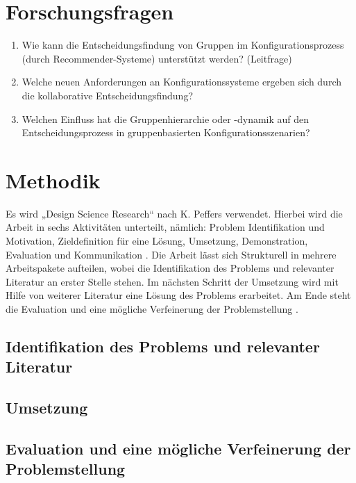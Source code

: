 \documentclass{article}
\begin{document}
\section{Forschungsfragen}

\begin{enumerate}
    \item Wie kann die Entscheidungsfindung von Gruppen im Konfigurationsprozess (durch Recommender-Systeme) unterstützt werden? (Leitfrage)
    \item Welche neuen Anforderungen an Konfigurationssysteme ergeben sich durch die kollaborative Entscheidungsfindung?
    \item Welchen Einfluss hat die Gruppenhierarchie oder -dynamik auf den Entscheidungsprozess in gruppenbasierten Konfigurationsszenarien?
\end{enumerate}

\section{Methodik}

Es wird „Design Science Research“ nach K. Peffers verwendet. Hierbei wird die Arbeit in sechs Aktivitäten unterteilt, nämlich: Problem Identifikation und Motivation, Zieldefinition für eine Lösung, Umsetzung, Demonstration, Evaluation und  Kommunikation \cite{peffersDesignScienceResearch2007}. Die Arbeit lässt sich Strukturell in mehrere Arbeitspakete aufteilen, wobei die Identifikation des Problems und relevanter Literatur an erster Stelle stehen. Im nächsten Schritt der Umsetzung wird mit Hilfe von weiterer Literatur eine Lösung des Problems erarbeitet. Am Ende steht die Evaluation und eine mögliche Verfeinerung der Problemstellung \cite{offermannOutlineDesignScience2009}.

\subsection{Identifikation des Problems und relevanter Literatur}

\subsection{Umsetzung}

\subsection{Evaluation und eine mögliche Verfeinerung der Problemstellung}

\printbibliography[heading=bibintoc]
\end{document}
